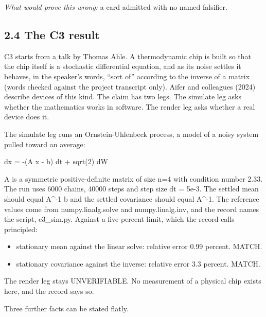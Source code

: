 \documentclass[11pt]{article}
\begin{document}
\emph{What would prove this wrong:} a card admitted with no named falsifier.

\subsection*{2.4 The C3 result}

C3 starts from a talk by Thomas Ahle. A thermodynamic chip is built so that the chip itself is a stochastic differential equation, and as its noise settles it behaves, in the speaker's words, ``sort of'' according to the inverse of a matrix (words checked against the project transcript only). Aifer and colleagues (2024) describe devices of this kind. The claim has two legs. The simulate leg asks whether the mathematics works in software. The render leg asks whether a real device does it.

The simulate leg runs an Ornstein-Uhlenbeck process, a model of a noisy system pulled toward an average:

dx = -(A x - b) dt + sqrt(2) dW

A is a symmetric positive-definite matrix of size n=4 with condition number 2.33. The run uses 6000 chains, 40000 steps and step size dt = 5e-3. The settled mean should equal A\textasciicircum{}-1 b and the settled covariance should equal A\textasciicircum{}-1. The reference values come from numpy.linalg.solve and numpy.linalg.inv, and the record names the script, c3\_sim.py. Against a five-percent limit, which the record calls principled:

\begin{itemize}
\item stationary mean against the linear solve: relative error 0.99 percent. MATCH.
\item stationary covariance against the inverse: relative error 3.3 percent. MATCH.
\end{itemize}
The render leg stays UNVERIFIABLE. No measurement of a physical chip exists here, and the record says so.

Three further facts can be stated flatly.
\end{document}
